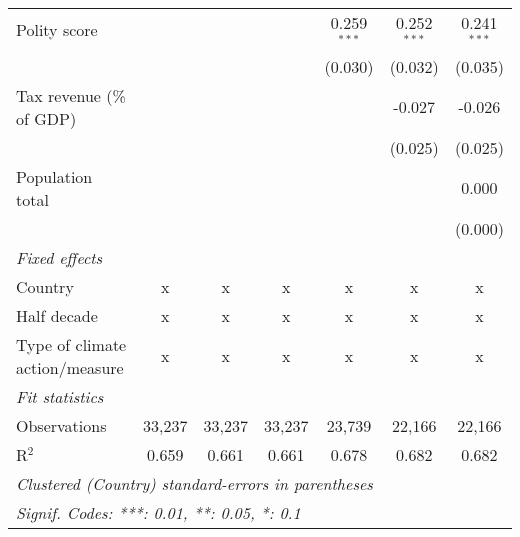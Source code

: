 \begin{tabular}{lcccccc}
   Polity score                                                         &         &                &                & 0.259$^{***}$  & 0.252$^{***}$  & 0.241$^{***}$\\   
                                                                        &         &                &                & (0.030)        & (0.032)        & (0.035)\\   
   Tax revenue (\% of GDP)                                              &         &                &                &                & -0.027         & -0.026\\   
                                                                        &         &                &                &                & (0.025)        & (0.025)\\   
   Population total                                                     &         &                &                &                &                & 0.000\\   
                                                                        &         &                &                &                &                & (0.000)\\   
   \emph{Fixed effects}\\
   Country                                                              & x       & x              & x              & x              & x              & x\\  
   Half decade                                                          & x       & x              & x              & x              & x              & x\\  
   Type of climate action/measure                                       & x       & x              & x              & x              & x              & x\\  
   \midrule \emph{Fit statistics}\\
   Observations                                                         & 33,237  & 33,237         & 33,237         & 23,739         & 22,166         & 22,166\\  
   R$^2$                                                                & 0.659   & 0.661          & 0.661          & 0.678          & 0.682          & 0.682\\  
   \midrule
   \multicolumn{7}{l}{\emph{Clustered (Country) standard-errors in parentheses}}\\
   \multicolumn{7}{l}{\emph{Signif. Codes: ***: 0.01, **: 0.05, *: 0.1}}\\
\end{tabular}
\par\endgroup


